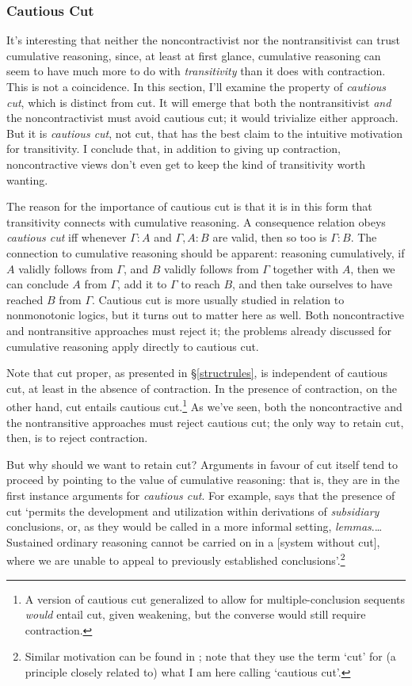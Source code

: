 \documentclass{ergoclass}
\newcommand{\sqq}[2]{\ensuremath{#1  \mathrel{:}  #2}}
\newcommand{\G}{\Gamma}
\renewcommand{\cite}{\citet}						%
\begin{document}
\subsubsection{Cautious Cut} \label{cautiouscut}



It's interesting that neither the noncontractivist nor the nontransitivist can trust cumulative reasoning, since, at least at first glance, cumulative reasoning can seem to have much more to do with {\em transitivity} than it does with contraction. This is not a coincidence. In this section, I'll examine the property of {\em cautious cut}, which is distinct from cut. It will emerge that both the nontransitivist {\em and} the noncontractivist must avoid cautious cut; it would trivialize either approach. But it is {\em cautious cut}, not cut, that has the best claim to the intuitive motivation for transitivity. I conclude that, in addition to giving up contraction, noncontractive views don't even get to keep the kind of transitivity worth wanting.

The reason for the importance of cautious cut is that it is in this form that transitivity connects with cumulative reasoning. A consequence relation obeys {\em cautious cut} iff whenever $\sqq{\G}{A}$ and $\sqq{\G, A}{B}$ are valid, then so too is $\sqq{\G}{B}$. The connection to cumulative reasoning should be apparent: reasoning cumulatively, if $A$ validly follows from $\G$, and $B$ validly follows from $\G$ together with $A$, then we can conclude $A$ from $\G$, add it to $\G$ to reach $B$, and then take ourselves to have reached $B$ from $\G$. Cautious cut is more usually studied in relation to nonmonotonic logics, but it turns out to matter here as well. Both noncontractive and nontransitive approaches must reject it; the problems already discussed for cumulative reasoning apply directly to cautious cut.



Note that cut proper, as presented in \S\ref{structrules}, is independent of cautious cut, at least in the absence of contraction. In the presence of contraction, on the other hand, cut entails cautious cut.\footnote{A version of cautious cut generalized to allow for multiple-conclusion sequents {\em would} entail cut, given weakening, but the converse would still require contraction.} As we've seen, both the noncontractive and the nontransitive approaches must reject cautious cut; the only way to retain cut, then, is to reject contraction.

But why should we want to retain cut? Arguments in favour of cut itself tend to proceed by pointing to the value of cumulative reasoning: that is, they are in the first instance arguments for {\em cautious cut}. For example, \cite[377]{boolos:dec} says that the presence of cut `permits the development and utilization within derivations of {\em subsidiary} conclusions, or, as they would be called in a more informal setting, {\em lemmas}.\ldots Sustained ordinary reasoning cannot be carried on in a [system without cut], where we are unable to appeal to previously established conclusions'.\footnote{Similar motivation can be found in \citet*{klm:nonmonotonic}; note that they use the term `cut' for (a principle closely related to) what I am here calling `cautious cut'.}
\end{document}
